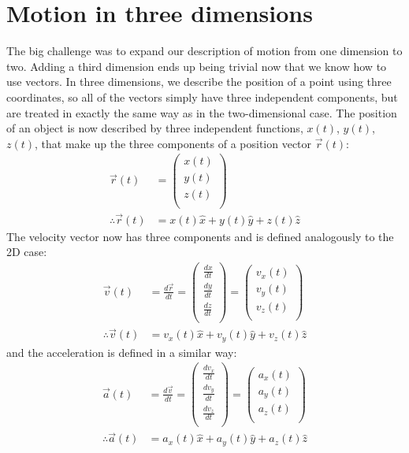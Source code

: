 \section{Motion in three dimensions}
The big challenge was to expand our description of motion from one dimension to two. Adding a third dimension ends up being trivial now that we know how to use vectors. In three dimensions, we describe the position of a point using three coordinates, so all of the vectors simply have three independent components, but are treated in exactly the same way as in the two-dimensional case. The position of an object is now described by three independent functions, $x(t)$, $y(t)$, $z(t)$, that make up the three components of a position vector $\vec r(t)$:
\begin{align*}
\vec r(t) &= \begin{pmatrix}
           x(t) \\
           y(t) \\
           z(t)  \\
         \end{pmatrix}\\
\therefore \vec r(t)  &= x(t) \hat x + y(t) \hat y + z(t) \hat z
\end{align*}
The velocity vector now has three components and is defined analogously to the 2D case:
\begin{align*}
\vec v(t) &=\frac{d\vec r}{dt}
 =\begin{pmatrix}
           \frac{dx}{dt}  \\
          \frac{dy}{dt}  \\
          \frac{dz}{dt}  \\
         \end{pmatrix}
 =\begin{pmatrix}
           v_x(t) \\
           v_y(t) \\
           v_z(t) \\
         \end{pmatrix}\\   
\therefore \vec v(t) &= v_x(t)\hat x+v_y(t)\hat y+v_z(t)\hat z  \nonumber 
\end{align*}
and the acceleration is defined in a similar way:
\begin{align*}
\vec a(t)  &=\frac{d\vec v}{dt}
 =\begin{pmatrix}
           \frac{dv_x}{dt}  \\
          \frac{dv_y}{dt}  \\
          \frac{dv_z}{dt}  \\
         \end{pmatrix}
 =\begin{pmatrix}
           a_x(t) \\
           a_y(t) \\
           a_z(t) \\
         \end{pmatrix}\\   
\therefore \vec a(t) &= a_x(t)\hat x+a_y(t)\hat y+a_z(t)\hat z  \nonumber 
\end{align*}

